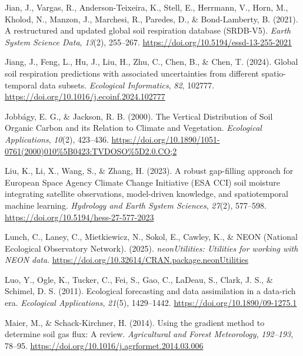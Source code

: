 \documentclass[
  letterpaper,
  DIV=11,
  numbers=noendperiod]{scrartcl}
\newlength{\cslhangindent}
\newenvironment{CSLReferences}[2] %
 {\begin{list}{}{%
  \setlength{\itemindent}{0pt}
  \setlength{\leftmargin}{0pt}
  \setlength{\parsep}{0pt}
  \ifodd #1
   \setlength{\leftmargin}{\cslhangindent}
   \setlength{\itemindent}{-1\cslhangindent}
  \fi
  \setlength{\itemsep}{#2\baselineskip}}}
 {\end{list}}
\begin{document}
\begin{CSLReferences}{1}{0}
Jian, J., Vargas, R., Anderson-Teixeira, K., Stell, E., Herrmann, V.,
Horn, M., Kholod, N., Manzon, J., Marchesi, R., Paredes, D., \&
Bond-Lamberty, B. (2021). A restructured and updated global soil
respiration database ({SRDB-V5}). \emph{Earth System Science Data},
\emph{13}(2), 255--267. \url{https://doi.org/10.5194/essd-13-255-2021}

Jiang, J., Feng, L., Hu, J., Liu, H., Zhu, C., Chen, B., \& Chen, T.
(2024). Global soil respiration predictions with associated
uncertainties from different spatio-temporal data subsets.
\emph{Ecological Informatics}, \emph{82}, 102777.
\url{https://doi.org/10.1016/j.ecoinf.2024.102777}

Jobbágy, E. G., \& Jackson, R. B. (2000). The {Vertical Distribution} of
{Soil Organic Carbon} and its {Relation} to {Climate} and {Vegetation}.
\emph{Ecological Applications}, \emph{10}(2), 423--436.
\url{https://doi.org/10.1890/1051-0761(2000)010\%5B0423:TVDOSO\%5D2.0.CO;2}

Liu, K., Li, X., Wang, S., \& Zhang, H. (2023). A robust gap-filling
approach for {European Space Agency Climate Change Initiative} ({ESA
CCI}) soil moisture integrating satellite observations, model-driven
knowledge, and spatiotemporal machine learning. \emph{Hydrology and
Earth System Sciences}, \emph{27}(2), 577--598.
\url{https://doi.org/10.5194/hess-27-577-2023}

Lunch, C., Laney, C., Mietkiewicz, N., Sokol, E., Cawley, K., \& NEON
(National Ecological Observatory Network). (2025). \emph{neonUtilities:
Utilities for working with NEON data}.
\url{https://doi.org/10.32614/CRAN.package.neonUtilities}

Luo, Y., Ogle, K., Tucker, C., Fei, S., Gao, C., LaDeau, S., Clark, J.
S., \& Schimel, D. S. (2011). Ecological forecasting and data
assimilation in a data-rich era. \emph{Ecological Applications},
\emph{21}(5), 1429--1442. \url{https://doi.org/10.1890/09-1275.1}

Maier, M., \& Schack-Kirchner, H. (2014). Using the gradient method to
determine soil gas flux: {A} review. \emph{Agricultural and Forest
Meteorology}, \emph{192--193}, 78--95.
\url{https://doi.org/10.1016/j.agrformet.2014.03.006}


\end{CSLReferences}
\end{document}

